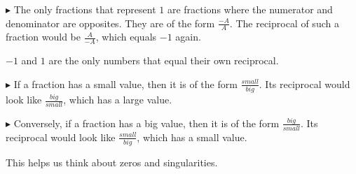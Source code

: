 \documentclass{ximera}
\begin{document}
$\blacktriangleright$ The only fractions that represent $1$ are fractions where the numerator and denominator are opposites.  They are of the form $\frac{-A}{A}$.  The reciprocal of such a fraction would be $\frac{A}{-A}$, which equals $-1$ again.



$-1$ and $1$ are the only numbers that equal their own reciprocal. 





$\blacktriangleright$ If a fraction has a small value, then it is of the form $\frac{small}{big}$.  Its reciprocal would look like $\frac{big}{small}$, which has a large value. 



$\blacktriangleright$ Conversely, if a fraction has a big value, then it is of the form $\frac{big}{small}$.  Its reciprocal would look like $\frac{small}{big}$, which has a small value. 




This helps us think about zeros and singularities.
\end{document}
